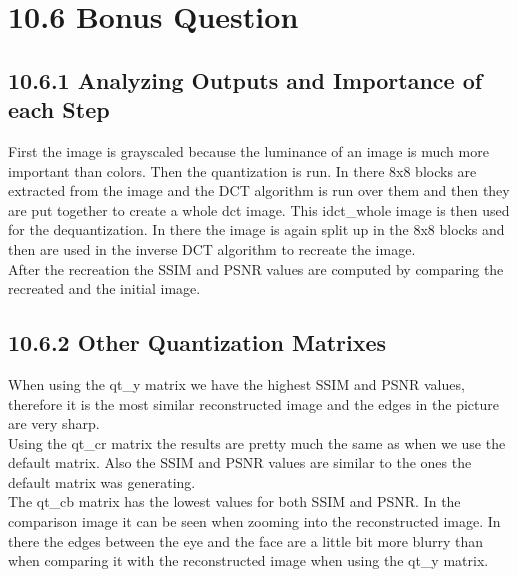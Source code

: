\documentclass{article}
\begin{document}
	\section*{10.6 Bonus Question}
	\begin{adjustwidth}{2em}{2em}
		\subsection*{10.6.1 Analyzing Outputs and Importance of each Step}
		\begin{adjustwidth}{2em}{2em}
			First the image is grayscaled because the luminance of an image is much more important than colors. Then the quantization is run. In there 8x8 blocks are extracted from the image and the DCT algorithm is run over them and then they are put together to create a whole dct image. This idct\_whole image is then used for the dequantization. In there the image is again split up in the 8x8 blocks and then are used in the inverse DCT algorithm to recreate the image. \\
			After the recreation the SSIM and PSNR values are computed by comparing the recreated and the initial image.
		\end{adjustwidth}
		\subsection*{10.6.2 Other Quantization Matrixes}
		\begin{adjustwidth}{2em}{2em}
			When using the qt\_y matrix we have the highest SSIM and PSNR values, therefore it is the most similar reconstructed image and the edges in the picture are very sharp. \\
			Using the qt\_cr matrix the results are pretty much the same as when we use the default matrix. Also the SSIM and PSNR values are similar to the ones the default matrix was generating. \\
			The qt\_cb matrix has the lowest values for both SSIM and PSNR. In the comparison image it can be seen when zooming into the reconstructed image. In there the edges between the eye and the face are a little bit more blurry than when comparing it with the reconstructed image when using the qt\_y matrix.
		\end{adjustwidth}
	\end{adjustwidth}
\end{document}
